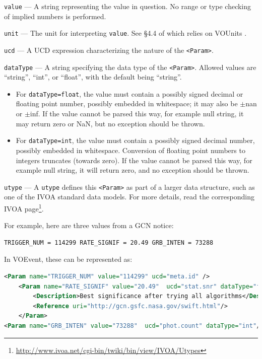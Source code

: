 \documentclass[11pt,a4paper]{ivoa}
\begin{document}
 {\tt value}\label{sec:3.3.1.2} --- A string representing the value in question. No range or type checking of implied numbers is performed. 

 {\tt unit}\label{sec:3.3.1.3} --- The unit for interpreting {\tt value}. See \S4.4 of \citep{2019ivoa.spec.1021O}
which relies on VOUnits \citep{2014ivoa.spec.0523D}.

 {\tt ucd}\label{sec:3.3.1.4} --- A UCD \citep{2018ivoa.spec.0527M}
expression characterizing the nature of the {\tt <Param>}. 

 {\tt dataType}\label{sec:3.3.1.5} --- A string specifying the data type of the {\tt <Param>}. Allowed values are ``string'', ``int'', or ``float'', with the default being ``string''. 
\begin{itemize}
\item For {\tt dataType=float}, the value must contain a possibly signed decimal or floating point number, possibly embedded in whitespace; it may also be $\pm$nan or $\pm$inf. If the value cannot be parsed this way, for example null string, it may return zero or NaN, but no exception should be thrown.
\item For {\tt dataType=int}, the value must contain a possibly signed decimal number, possibly embedded in whitespace. Conversion of floating point numbers to integers truncates (towards zero). If the value cannot be parsed this way, for example null string, it will return zero, and no exception should be thrown.
\end{itemize}

 {\tt utype}\label{sec:3.3.1.6} --- A {\tt utype} defines this {\tt <Param>} as part of a larger data structure, such as one of the IVOA standard data models. For more details, read the corresponding IVOA page\footnote{\url{http://www.ivoa.net/cgi-bin/twiki/bin/view/IVOA/Utypes}}. 

For example, here are three values from a GCN \citep{bib04} notice: 
\begin{lstlisting}[language=XML]
TRIGGER_NUM = 114299 RATE_SIGNIF = 20.49 GRB_INTEN = 73288 
\end{lstlisting}
In VOEvent, these can be represented as: 
\begin{lstlisting}[language=XML]
<Param name="TRIGGER_NUM" value="114299" ucd="meta.id" />
    <Param name="RATE_SIGNIF" value="20.49"  ucd="stat.snr" dataType="float">
        <Description>Best significance after trying all algorithms</Description>
        <Reference uri="http://gcn.gsfc.nasa.gov/swift.html"/>
    </Param>
<Param name="GRB_INTEN" value="73288"  ucd="phot.count" dataType="int"/> 
\end{lstlisting}
\end{document}
